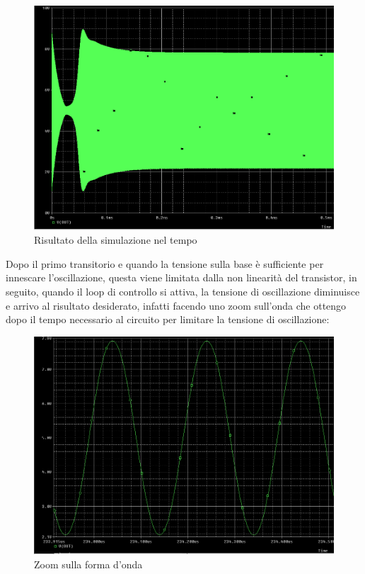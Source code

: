\documentclass{article}
\begin{document}
~\begin{figure}[H]
\includegraphics[width=\textwidth]{SimulazioneNuova.png}
\centering
\caption{Risultato della simulazione nel tempo}
\label{fig:foo}
\end{figure}
Dopo il primo transitorio e quando la tensione sulla base è sufficiente per innescare l'oscillazione, questa viene limitata dalla non linearità del transistor, in seguito, quando il loop di controllo  si attiva, la tensione di oscillazione diminuisce e arrivo al risultato desiderato, infatti facendo uno zoom sull'onda che ottengo dopo il tempo necessario al circuito per limitare la tensione di oscillazione:
~\begin{figure}[H]
\includegraphics[width=\textwidth]{SimulazioneNuovaZoom.png}
\centering
\caption{Zoom sulla forma d'onda}
\label{fig:foo}
\end{figure}
\end{document}
